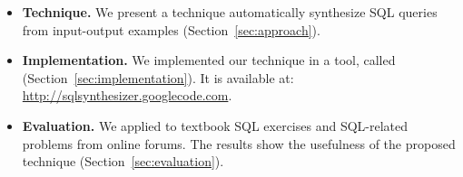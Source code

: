 \begin{itemize}

\item \textbf{Technique.} We present a technique automatically
synthesize SQL queries from input-output examples
(Section~\ref{sec:approach}).

\item \textbf{Implementation.} We implemented our technique in a
tool, called \ourtool (Section~\ref{sec:implementation}). It is
available at: \url{http://sqlsynthesizer.googlecode.com}.

\item \textbf{Evaluation.} We applied \ourtool
to \exnum textbook SQL exercises and \pnum 
SQL-related problems from online forums.
The results show the usefulness of the proposed technique
(Section~\ref{sec:evaluation}).
\end{itemize}
